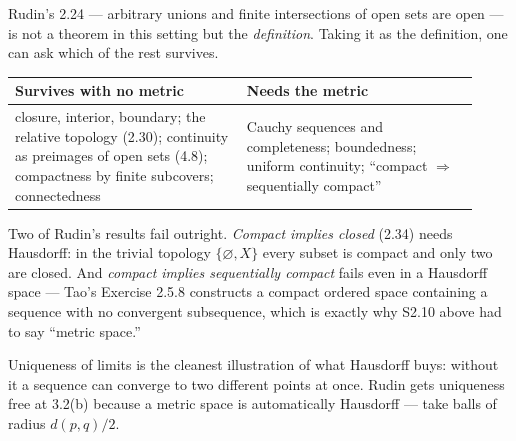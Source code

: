 \begin{deeper}
Rudin's 2.24 --- arbitrary unions and finite intersections of open sets are
open --- is not a theorem in this setting but the \emph{definition}. Taking
it as the definition, one can ask which of the rest survives.

\smallskip
\begin{tabular}{@{}p{0.46\linewidth}p{0.46\linewidth}@{}}
\toprule
\textbf{Survives with no metric} & \textbf{Needs the metric} \\
\midrule
closure, interior, boundary; the relative topology (2.30); continuity as
preimages of open sets (4.8); compactness by finite subcovers; connectedness
& Cauchy sequences and completeness; boundedness; uniform continuity;
``compact $\Rightarrow$ sequentially compact'' \\
\bottomrule
\end{tabular}

\smallskip
Two of Rudin's results fail outright. \emph{Compact implies closed} (2.34)
needs Hausdorff: in the trivial topology $\{\varnothing, X\}$ every subset is
compact and only two are closed. And \emph{compact implies sequentially
compact} fails even in a Hausdorff space --- Tao's Exercise 2.5.8 constructs
a compact ordered space containing a sequence with no convergent
subsequence, which is exactly why S2.10 above had to say ``metric space.''

Uniqueness of limits is the cleanest illustration of what Hausdorff buys:
without it a sequence can converge to two different points at once. Rudin
gets uniqueness free at 3.2(b) because a metric space is automatically
Hausdorff --- take balls of radius $d(p,q)/2$.
\end{deeper}
